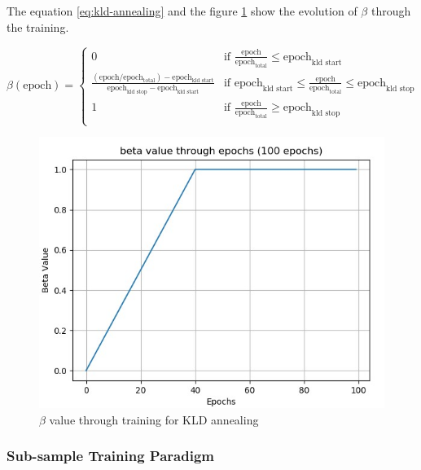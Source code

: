\documentclass[12pt]{report}
\begin{document}
The equation \ref{eq:kld-annealing} and the figure \ref{fig:beta-annealing} show the evolution of $\beta$ through the training.

\begin{equation}
    \beta (\text{epoch}) =
    \begin{cases}
        0 & \text{if } \frac{\text{epoch}}{\text{epoch}_{\text{total}}} \leq \text{epoch}_{\text{kld start}} \\
        
        \frac{(\text{epoch} / \text{epoch}_{\text{total}}) - \text{epoch}_{\text{kld start}}}{\text{epoch}_{\text{kld stop}} - \text{epoch}_{\text{kld start}}} & \text{if } \text{epoch}_{\text{kld start}} \leq \frac{\text{epoch}}{\text{epoch}_{\text{total}}} \leq \text{epoch}_{\text{kld stop}} \\
        
        1 & \text{if } \frac{\text{epoch}}{\text{epoch}_{\text{total}}} \geq \text{epoch}_{\text{kld stop}} \\
    \end{cases}
    \label{eq:kld-annealing}
\end{equation}

\begin{figure}[htbp]
    \centering
    \includegraphics[width=0.8 \textwidth]{images/nn/training/beta-annealing.jpg}
    \caption{$\beta$ value through training for KLD annealing}
    \label{fig:beta-annealing}
\end{figure}

\subsubsection{Sub-sample Training Paradigm}
\end{document}
